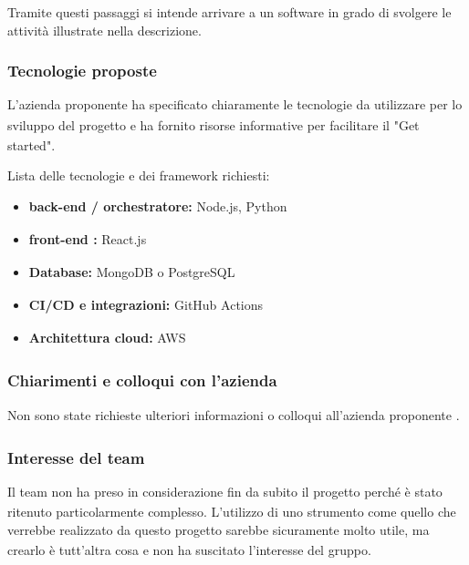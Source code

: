 \documentclass[a4paper,11pt]{article}
\begin{document}
Tramite questi passaggi si intende arrivare a un software in grado di svolgere le attività illustrate nella descrizione.

\subsubsection{Tecnologie proposte}

L'azienda proponente\textsubscript{}
 ha specificato chiaramente le tecnologie da utilizzare per lo sviluppo del progetto\textsubscript{}
 e ha fornito risorse informative per facilitare il "Get started".

Lista delle tecnologie e dei framework richiesti:

\begin{itemize}[leftmargin=*]
  \item \textbf{back-end\textsubscript{}
 / orchestratore:} Node.js, Python
  \item \textbf{front-end\textsubscript{}
:} React.js
  \item \textbf{Database:} MongoDB o PostgreSQL\textsubscript{}
  \item \textbf{CI/CD e integrazioni:} GitHub\textsubscript{}
 Actions
  \item \textbf{Architettura cloud:} AWS\textsubscript{}

\end{itemize}

\subsubsection{Chiarimenti e colloqui con l'azienda}
Non sono state richieste ulteriori informazioni o colloqui all'azienda proponente\textsubscript{}
.
\subsubsection{Interesse del team}
Il team non ha preso in considerazione fin da subito il progetto\textsubscript{}
 perché è stato ritenuto particolarmente complesso. L'utilizzo di uno strumento come quello che verrebbe realizzato da questo progetto\textsubscript{}
 sarebbe sicuramente molto utile, ma crearlo è tutt'altra cosa e non ha suscitato l'interesse del gruppo.
\end{document}
